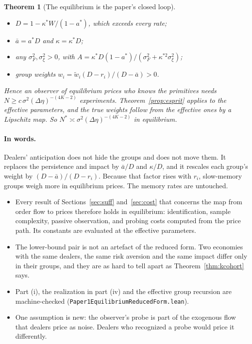 \documentclass[12pt]{article}
\newtheorem{theorem}{Theorem}[section]
\theoremstyle{definition}
\theoremstyle{remark}
\begin{document}
\begin{theorem}[The equilibrium is the paper's closed loop]
\begin{enumerate}[label=(\roman*),itemsep=1pt]
 \begin{itemize}[itemsep=1pt,topsep=2pt]
 \item $D=1-\kappa^*W/(1-a^*)$, which exceeds every rate;
 \item $\bar a=a^*D$ and $\kappa=\kappa^*D$;
 \item any $\sigma_F^2,\sigma_\xi^2>0$, with $A=\kappa^*D(1-a^*)/(\sigma_F^2+\kappa^{*2}\sigma_\xi^2)$;
 \item group weights $w_i=\tilde w_i(D-r_i)/(D-\bar a)>0$.
 \end{itemize}
 Hence an observer of equilibrium prices who knows the primitives needs $N\ge c\,\sigma^2(\Delta\eta)^{-(4K-2)}$ experiments. Theorem~\ref{prop:esprit} applies to the effective parameters, and the true weights follow from the effective ones by a Lipschitz map. So $N^*\asymp\sigma^2(\Delta\eta)^{-(4K-2)}$ in equilibrium.
\end{enumerate}
\end{theorem}

\paragraph{In words.} Dealers' anticipation does not hide the groups and does not move them. It replaces the persistence and impact by $\bar a/D$ and $\kappa/D$, and it rescales each group's weight by $(D-\bar a)/(D-r_i)$. Because that factor rises with $r_i$, slow-memory groups weigh more in equilibrium prices. The memory rates are untouched.
\begin{itemize}[itemsep=1pt,topsep=2pt]
\item Every result of Sections~\ref{sec:suff} and~\ref{sec:cost} that concerns the map from order flow to prices therefore holds in equilibrium: identification, sample complexity, passive observation, and probing costs computed from the price path. Its constants are evaluated at the effective parameters.
\item The lower-bound pair is not an artefact of the reduced form. Two economies with the same dealers, the same risk aversion and the same impact differ only in their groups, and they are as hard to tell apart as Theorem~\ref{thm:kcohort} says.
\item Part (i), the realization in part (iv) and the effective group recursion are machine-checked (\nolinkurl{Paper1EquilibriumReducedForm.lean}).
\item One assumption is new: the observer's probe is part of the exogenous flow that dealers price as noise. Dealers who recognized a probe would price it differently.
\end{itemize}
\end{document}
